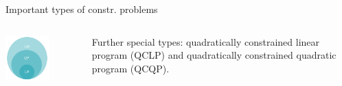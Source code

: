 \begin{vbframe}{Important types of constr. problems}
\vspace*{-0.6cm}

\begin{columns}[T] %
	\begin{column}{.58\textwidth}
		\begin{center}
			\includegraphics[width=0.6\textwidth]{figure_man/classes_optimization_problems.png} 
		\end{center}
	\end{column}
	\begin{column}{.38\textwidth} \vspace*{1.5cm}
		\begin{footnotesize}
		Further special types: quadratically constrained linear program (QCLP) and quadratically constrained quadratic program (QCQP). 
		\end{footnotesize}
	\end{column}
\end{columns}





\end{vbframe}

